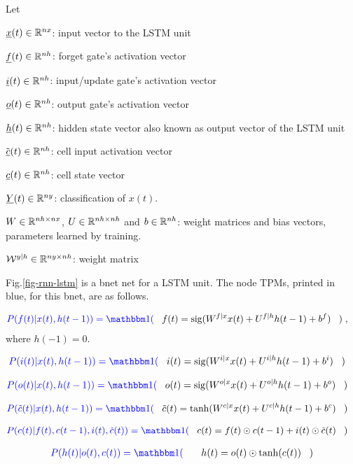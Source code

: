 Let

${\underline{x}}(t)\in { \mathbb{R}}^{nx}$:
input vector to the LSTM unit

${\underline{f}}(t)\in { \mathbb{R}}^{nh}$:
forget gate's activation vector

${\underline{i}}(t)\in { \mathbb{R}}^{nh}$:
input/update gate's activation vector

${\underline{o}}(t)\in { \mathbb{R}}^{nh}$:
output gate's activation vector

${\underline{h}}(t)\in { \mathbb{R}}^{nh}$:
hidden state vector also known as
 output vector of the LSTM unit

${\tilde {{\underline{c}}}}(t)\in { \mathbb{R}}^{nh}$:
cell input activation vector

${\underline{c}}(t)\in { \mathbb{R}}^{nh}$:
cell state vector

${\underline{Y}}(t)\in { \mathbb{R}}^{ny}$:
classification of $x(t)$.

$W\in { \mathbb{R}}^{nh\times nx}$,
$U\in { \mathbb{R}}^{nh\times nh}$
and 
$b\in { \mathbb{R}}^{nh}$:
weight matrices and bias vectors,
 parameters learned by training.

${\cal W}^{y|h}\in { \mathbb{R}}^{ny\times nh}$:
 weight matrix


Fig.\ref{fig-rnn-lstm}
is a bnet net
for a LSTM unit.
The node TPMs, printed in blue,
for this bnet, are
as follows.

\begin{align}\color{blue}
P(f(t)|x(t), h(t-1))=\indi(\;\;\;&
f(t)=\sig(W^{f|x}x(t)+
U^{f|h}h(t-1)+b^{f})
\;\;\;)
\;,
\end{align}
where $h(-1)=0$.

\begin{align}\color{blue}
P(i(t)|x(t), h(t-1))=\indi(\;\;\;&
i(t)=\sig(W^{i|x}x(t)
+U^{i|h}h(t-1)+b^{i})
\;\;\;)
\end{align}

\begin{align}\color{blue}
P(o(t)|x(t), h(t-1))=\indi(\;\;\;&
o(t)=\sig(W^{o|x}x(t)
+U^{o|h}h(t-1)+b^{o})
\;\;\;)
\end{align}

\begin{align}\color{blue}
P(\tilde{c}(t)|x(t), h(t-1))=\indi(\;\;\;&
\tilde{c}(t)=\tanh
(W^{c|x}x(t)+U^{c|h}h(t-1)+b^{c})
\;\;\;)
\end{align}

\begin{align}\color{blue}
P(c(t)|f(t), c(t-1), i(t),
 \tilde{c}(t))
=\indi(\;\;\;&
c(t)=f(t)\odot c(t-1)+
i(t)\odot {\tilde {c}}(t)
\;\;\;)
\end{align}

\begin{align}\color{blue}
P(h(t)|o(t), c(t))=\indi(\;\;\;&&
h(t)=o(t)\odot \tanh
(c(t))
\;\;\;)
\end{align}



